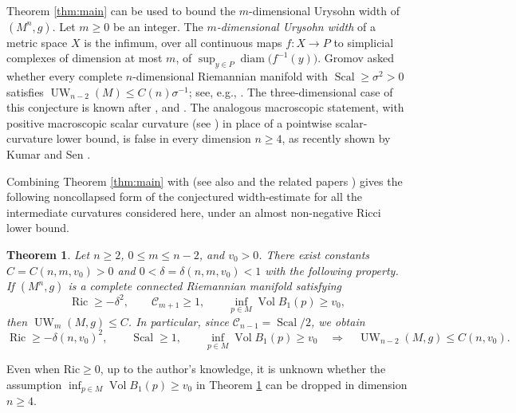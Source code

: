 \documentclass[11pt]{amsart}
\newtheorem{theorem}{Theorem}[section]
\theoremstyle{definition}
\theoremstyle{remark}
\DeclareMathOperator{\Ric}{Ric}
\DeclareMathOperator{\Scal}{Scal}
\DeclareMathOperator{\Vol}{Vol}
\begin{document}
Theorem \ref{thm:main} can be used to bound the $m$-dimensional Urysohn width of $(M^n,g)$. Let $m\geq 0$ be an integer. The \textit{$m$-dimensional Urysohn width} of a metric space $X$ is the infimum, over all continuous maps $f\colon X\to P$
to simplicial complexes of dimension at most $m$, of $\sup_{y\in P}\operatorname{diam}\bigl(f^{-1}(y)\bigr)$. Gromov asked whether every complete
$n$-dimensional Riemannian manifold with $\Scal\geq\sigma^2>0$ satisfies $\operatorname{UW}_{n-2}(M)\leq C(n)\sigma^{-1}$;
see, e.g., \cite[\S~2.A(c)]{GromovLarge}.  The
three-dimensional case of this conjecture is known after \cite[Theorem~1.1]{LiokumovichMaximo}, and \cite[Theorem~1.1]{LiokumovichWang}. The analogous macroscopic statement, with positive macroscopic scalar
curvature (see \cite{GuthMacroscopic}) in place of a pointwise scalar-curvature lower bound, is false
in every dimension $n\geq4$, as recently shown by Kumar and Sen
\cite[Theorem~A]{KumarSen}.

Combining Theorem \ref{thm:main} with \cite[Theorem~3.3]{Papasoglu} (see also \cite[Theorem 1.6]{LiokumovichLishakNabutovskyRotman} and the related papers \cite{GuthLargeBalls, GuthUrysohnWidth, NabutovskyWidth}) gives the following
noncollapsed form of the conjectured width-estimate for all the intermediate
curvatures considered here, under an almost non-negative Ricci lower bound. 

\begin{theorem}
\label{cor:noncollapsed-urysohn-width}
Let $n\geq2$, $0\leq m\leq n-2$, and $v_0>0$.  There exist constants
$C=C(n,m,v_0)>0$ and $0<\delta=\delta(n,m,v_0)<1$ with the following property.  If $(M^n,g)$ is a
complete connected Riemannian manifold satisfying
\[
 \Ric\geq -\delta^2,\qquad
 \mathcal{C}_{m+1}\geq1,\qquad
 \inf_{p\in M}\Vol B_1(p)\geq v_0,
\]
then $\operatorname{UW}_m(M,g)\leq C$.
In particular, since $\mathcal{C}_{n-1}=\Scal/2$, we obtain
\[
 \Ric\geq -\delta(n,v_0)^2,\qquad \Scal\geq1,
 \qquad \inf_{p\in M}\Vol B_1(p)\geq v_0
 \quad\Longrightarrow\quad
 \operatorname{UW}_{n-2}(M,g)\leq C(n,v_0).
\]
\end{theorem}
Even when $\mathrm{Ric}\geq 0$, up to the author's knowledge, it is unknown whether the assumption $\inf_{p\in M}\Vol B_1(p)\geq v_0$ in Theorem \ref{cor:noncollapsed-urysohn-width} can be dropped in dimension $n\geq 4$. 
\smallskip
\end{document}
